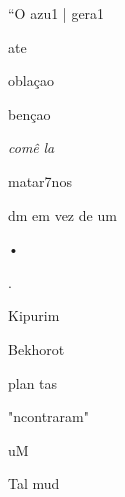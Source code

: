 ``O azu1 | gera1

ate

oblaçao

bençao

\emph{comê} \emph{la}


matar7nos

dm em vez de um


•

 .

Kipurim

Bekhorot

plan tas

"ncontraram"

uM

Tal mud